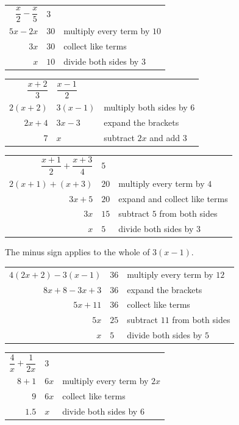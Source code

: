 \documentclass[aspectratio=169]{beamer}
\makeatletter
\newcommand{\steps}[1]{%
  \begin{tabular}{@{}r@{${}={}$}l@{\qquad}l@{}}#1\end{tabular}%
}
\newcommand{\by}[1]{{\normalsize #1}}
\makeatother
\begin{document}
  {\steps{$\dfrac{x}{2}-\dfrac{x}{5}$ & $3$ & \\[0.95em]
          $5x-2x$ & $30$ & \by{multiply every term by $10$}\\
          $3x$ & $30$ & \by{collect like terms}\\
          $x$ & $10$ & \by{divide both sides by $3$}}}

  {\steps{$\dfrac{x+2}{3}$ & $\dfrac{x-1}{2}$ & \\[0.95em]
          $2(x+2)$ & $3(x-1)$ & \by{multiply both sides by $6$}\\
          $2x+4$ & $3x-3$ & \by{expand the brackets}\\
          $7$ & $x$ & \by{subtract $2x$ and add $3$}}}

  {\steps{$\dfrac{x+1}{2}+\dfrac{x+3}{4}$ & $5$ & \\[0.95em]
          $2(x+1)+(x+3)$ & $20$ & \by{multiply every term by $4$}\\
          $3x+5$ & $20$ & \by{expand and collect like terms}\\
          $3x$ & $15$ & \by{subtract $5$ from both sides}\\
          $x$ & $5$ & \by{divide both sides by $3$}}}

  {The minus sign applies to the whole of $3(x-1)$.
   \par\vspace{0.3em}
   \steps{$4(2x+2)-3(x-1)$ & $36$ & \by{multiply every term by $12$}\\
          $8x+8-3x+3$ & $36$ & \by{expand the brackets}\\
          $5x+11$ & $36$ & \by{collect like terms}\\
          $5x$ & $25$ & \by{subtract $11$ from both sides}\\
          $x$ & $5$ & \by{divide both sides by $5$}}}

  {\steps{$\dfrac{4}{x}+\dfrac{1}{2x}$ & $3$ & \\[0.95em]
          $8+1$ & $6x$ & \by{multiply every term by $2x$}\\
          $9$ & $6x$ & \by{collect like terms}\\
          $1.5$ & $x$ & \by{divide both sides by $6$}}}
\end{document}
